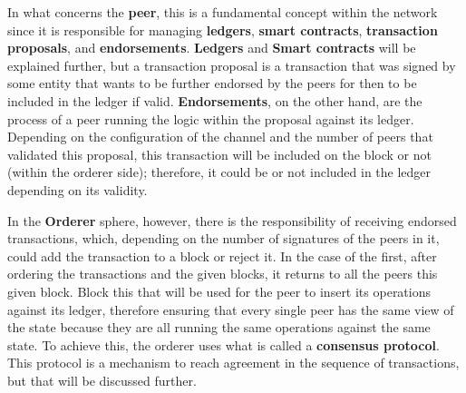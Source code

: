 In what concerns the \textbf{peer}, this is a fundamental concept within the network since it is responsible for managing \textbf{ledgers}, \textbf{smart contracts}, \textbf{transaction proposals}, and \textbf{endorsements}. \textbf{Ledgers} and \textbf{Smart contracts} will be explained further, but a transaction proposal is a transaction that was signed by some entity that wants to be further endorsed by the peers for then to be included in the ledger if valid. \textbf{Endorsements}, on the other hand, are the process of a peer running the logic within the proposal against its ledger. Depending on the configuration of the channel and the number of peers that validated this proposal, this transaction will be included on the block or not (within the orderer side); therefore, it could be or not included in the ledger depending on its validity.

In the \textbf{Orderer} sphere, however, there is the responsibility of receiving endorsed transactions, which, depending on the number of signatures of the peers in it, could add the transaction to a block or reject it. In the case of the first, after ordering the transactions and the given blocks, it returns to all the peers this given block. Block this that will be used for the peer to insert its operations against its ledger, therefore ensuring that every single peer has the same view of the state because they are all running the same operations against the same state. To achieve this, the orderer uses what is called a \textbf{consensus protocol}. This protocol is a mechanism to reach agreement in the sequence of transactions, but that will be discussed further.

